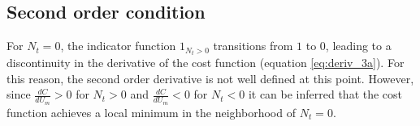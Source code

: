 \subsection{Second order condition}
For $N_t = 0$, the indicator function $1_{N_t > 0}$ transitions from $1$ to $0$, leading to a discontinuity in the derivative of the cost function (equation \ref{eq:deriv_3a}). For this reason, the second order derivative is not well defined at this point. However, since $\frac{dC}{dU_m}>0$ for $N_t > 0$ and $\frac{dC}{dU_m}<0$ for $N_t < 0$ it can be inferred that the cost function achieves a local minimum in the neighborhood of $N_t=0$.
